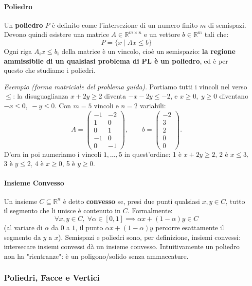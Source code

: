 \documentclass[12pt]{extarticle} %
\begin{document}
\paragraph{Poliedro}
Un \textbf{poliedro} $P$ è definito come l'intersezione di un numero finito $m$ di semispazi. Devono quindi esistere una matrice $A \in \mathbb{R}^{m \times n}$ e un vettore $b \in \mathbb{R}^m$ tali che:
\[ P = \{x \mid Ax \le b\} \]
Ogni riga $A_i x \le b_i$ della matrice è un vincolo, cioè un semispazio: \textbf{la regione ammissibile di un qualsiasi problema di PL è un poliedro}, ed è per questo che studiamo i poliedri.

\noindent\textit{Esempio (forma matriciale del problema guida).} Portiamo tutti i vincoli nel verso $\le$: la disuguaglianza $x+2y\ge2$ diventa $-x-2y\le-2$, e $x\ge0,\;y\ge0$ diventano $-x\le0,\;-y\le0$. Con $m=5$ vincoli e $n=2$ variabili:
\[
A=\begin{pmatrix} -1 & -2 \\ 1 & 0 \\ 0 & 1 \\ -1 & 0 \\ 0 & -1 \end{pmatrix},
\qquad
b=\begin{pmatrix} -2 \\ 3 \\ 2 \\ 0 \\ 0 \end{pmatrix}.
\]
D'ora in poi numeriamo i vincoli $1,\dots,5$ in quest'ordine: 1 è $x+2y\ge2$, 2 è $x\le3$, 3 è $y\le2$, 4 è $x\ge0$, 5 è $y\ge0$.

\paragraph{Insieme Convesso}
Un insieme $C \subseteq \mathbb{R}^n$ è detto \textbf{convesso} se, presi due punti qualsiasi $x, y \in C$, tutto il segmento che li unisce è contenuto in $C$. Formalmente:
\[ \forall x,y \in C, \; \forall \alpha \in [0,1] \implies \alpha x + (1-\alpha)y \in C \]
(al variare di $\alpha$ da $0$ a $1$, il punto $\alpha x + (1-\alpha)y$ percorre esattamente il segmento da $y$ a $x$).
Semispazi e poliedri sono, per definizione, insiemi convessi: intersecare insiemi convessi dà un insieme convesso. Intuitivamente un poliedro non ha "rientranze": è un poligono/solido senza ammaccature.

\subsubsection{Poliedri, Facce e Vertici}
\end{document}
